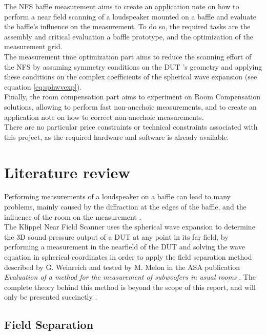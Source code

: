 \documentclass{report}
\begin{document}
The NFS baffle measurement aims to create an application note on how to perform a near field scanning of a loudspeaker mounted on a baffle and evaluate the baffle's influence on the measurement. To do so, the required tasks are the assembly and critical evaluation a baffle prototype, and the optimization of the measurement grid.\\
The measurement time optimization part aims to reduce the scanning effort of the NFS by assuming symmetry conditions on the DUT 's geometry and applying these conditions on the complex coefficients of the spherical wave expansion (see equation \ref{eq:sphwvexp}). \\
Finally, the room compensation part aims to experiment on Room Compensation solutions,  allowing to perform fast non-anechoic measurements, and to create an application note on how to correct non-anechoic measurements.\\

There are no particular price constraints or technical constraints associated with this project, as the required hardware and software is already available. 

\newpage

\section{Literature review}

Performing measurements of a loudspeaker on a baffle can lead to many problems, mainly caused by the diffraction at the edges of the baffle, and the influence of the room on the measurement \cite{LIS}.\\
The Klippel Near Field Scanner uses the spherical wave expansion to determine the 3D sound pressure output of a DUT at any point in its far field, by performing a measurement in the nearfield of the DUT and solving the wave equation in spherical coordinates in order to apply the field separation method described by G. Weinreich and tested by M. Melon in the ASA publication \textit{Evaluation of a method for the measurement of subwoofers in usual rooms}   \cite{melon1}. The complete theory behind this method is beyond the scope of this report, and will only be presented succinctly \citep[see][sect.~3]{aeshs} \citep[see][chap.~6]{Fourier}. 

\subsection{Field Separation}
\label{sec:FieldSep}
\end{document}
